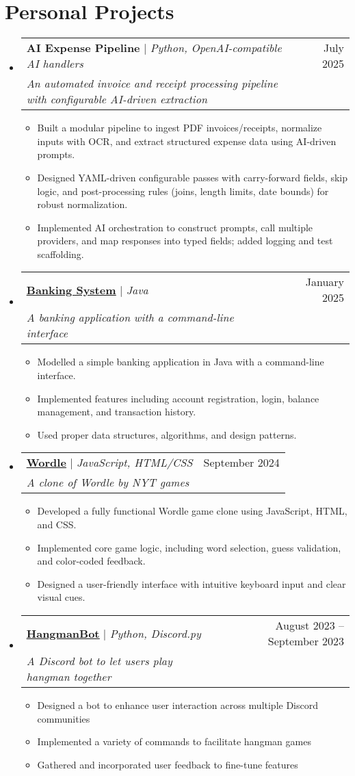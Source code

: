 \documentclass[letterpaper,11pt]{article}
\makeatletter
\newcommand{\resumeItem}[1]{
  \item\small{
    {#1 \vspace{-2pt}}
  }
}
\newcommand{\resumeProjectHeading}[3]{
    \item
    \begin{tabular*}{0.97\textwidth}{l@{\extracolsep{\fill}}r}
      \small#1 & #2 \\
      \textit{\small #3} & \\
    \end{tabular*}\vspace{-7pt}
}
\newcommand{\resumeSubHeadingListStart}{\begin{itemize}[leftmargin=0.15in, label={}]}
\newcommand{\resumeSubHeadingListEnd}{\end{itemize}}
\newcommand{\resumeItemListStart}{\begin{itemize}}
\newcommand{\resumeItemListEnd}{\end{itemize}\vspace{-5pt}}
\makeatother
\begin{document}
\section{Personal Projects}
\resumeSubHeadingListStart
\resumeProjectHeading
{\textbf{AI Expense Pipeline} $|$ \emph{Python, OpenAI-compatible AI handlers}}{July 2025}{An automated invoice and receipt processing pipeline with configurable AI-driven extraction}
\resumeItemListStart
\resumeItem{Built a modular pipeline to ingest PDF invoices/receipts, normalize inputs with OCR, and extract structured expense data using AI-driven prompts.}
\resumeItem{Designed YAML-driven configurable passes with carry-forward fields, skip logic, and post-processing rules (joins, length limits, date bounds) for robust normalization.}
\resumeItem{Implemented AI orchestration to construct prompts, call multiple providers, and map responses into typed fields; added logging and test scaffolding.}
\resumeItemListEnd
\resumeProjectHeading
{\textbf{\href{https://github.com/vsharha/Java-Banking-System}{\underline{Banking System}}} $|$ \emph{Java}}{January 2025}{A banking application with a command-line interface}
\resumeItemListStart
\resumeItem{Modelled a simple banking application in Java with a command-line interface.}
\resumeItem{Implemented features including account registration, login, balance management, and transaction history.}
\resumeItem{Used proper data structures, algorithms, and design patterns.}
\resumeItemListEnd
\resumeProjectHeading
{\textbf{\href{https://vsharha.github.io/Wordle/}{\underline{Wordle}}} $|$ \emph{JavaScript, HTML/CSS}}{September 2024}{A clone of Wordle by NYT games}
\resumeItemListStart
\resumeItem{Developed a fully functional Wordle game clone using JavaScript, HTML, and CSS.}
\resumeItem{Implemented core game logic, including word selection, guess validation, and color-coded feedback.}
\resumeItem{Designed a user-friendly interface with intuitive keyboard input and clear visual cues.}
\resumeItemListEnd

\resumeProjectHeading
{\textbf{\href{https://github.com/vsharha/HangmanBot/}{\underline{HangmanBot}}} $|$ \emph{Python, Discord.py}}{August 2023 -- September 2023}{A Discord bot to let users play hangman together}
\resumeItemListStart
\resumeItem{Designed a bot to enhance user interaction across multiple Discord communities}
\resumeItem{Implemented a variety of commands to facilitate hangman games}
\resumeItem{Gathered and incorporated user feedback to fine-tune features}
\resumeItemListEnd
\resumeSubHeadingListEnd
\end{document}
